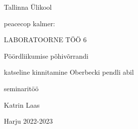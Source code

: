 \begin{titlepage}
\par{Tallinna Ülikool}
\vspace{0.3\textheight}
\par{peacecop kalmer:}
\LARGE
\par{LABORATOORNE TÖÖ 6}
\par{Pöördliikumise põhivõrrandi}
\par{katseline kinnitamine Oberbecki pendli abil}
\normalsize
\par{seminaritöö}
\vspace{0.3\textheight}
\begin{flushright}
\par{Katrin Laas}
\end{flushright}
\vfill
Harju
\hfill
2022-2023
\end{titlepage}
